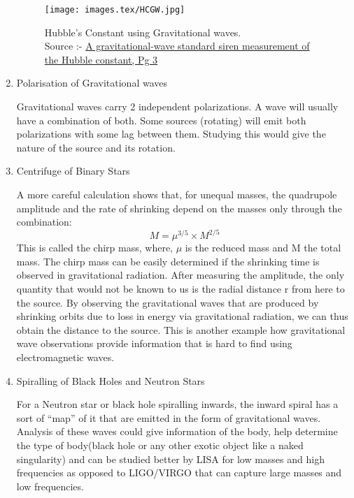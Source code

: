 \begin{enumerate}
        \begin{figure}[h]
            \centering
            \texttt{[image: images.tex/HCGW.jpg]}
            \caption{Hubble's Constant using Gravitational waves.\\
            Source :- \href{https://www.researchgate.net/profile/Michael-Ross-9/publication/324600496}{A gravitational-wave standard siren measurement of the Hubble constant, Pg 3}}
        \end{figure}

    \item Polarisation of Gravitational waves
    
    \hspace{1cm}Gravitational waves carry 2 independent polarizations. A wave will usually have a combination of both. Some sources (rotating) will emit both polarizations with some lag between them. Studying this would give the nature of the source and its rotation.\\

    \item Centrifuge of Binary Stars
    
    \hspace{1cm}A more careful calculation shows that, for unequal masses, the quadrupole amplitude and the rate of shrinking depend on the masses only through the combination:
    \begin{equation}
    \ M=\mu^{3/5} \times M^{2/5}\
    \end{equation}
    \hspace{1cm}This is called the chirp mass, where, $\mu$ is the reduced mass and M the total mass. The chirp mass can be easily determined if the shrinking time is observed in gravitational radiation. After measuring the amplitude, the only quantity that would not be known to us is the radial distance r from here to the source. By observing the gravitational waves that are produced by shrinking orbits due to loss in energy via gravitational radiation, we can thus obtain the distance to the source. This is another example how gravitational wave observations provide information that is hard to find using electromagnetic waves.\\

    \item Spiralling of Black Holes and Neutron Stars
    
    \hspace{1cm}For a Neutron star or black hole spiralling inwards, the inward spiral has a sort of “map” of it that are emitted in the form of gravitational waves. Analysis of these waves could give information of the body, help determine the type of body(black hole or any other exotic object like a naked singularity)  and can be studied better by LISA for low masses and high frequencies as opposed to LIGO/VIRGO that can capture large masses and low frequencies.\\
    


\end{enumerate}
